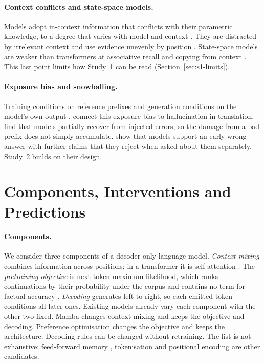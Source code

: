 \documentclass[10pt]{article}
\begin{document}
\paragraph{Context conflicts and state-space models.} Models adopt in-context information that conflicts with their parametric knowledge, to a degree that varies with model and context \citep{longpre2021,xie2024}. They are distracted by irrelevant context \citep{shi2023distracted} and use evidence unevenly by position \citep{liu2024}. State-space models are weaker than transformers at associative recall and copying from context \citep{arora2024zoology,jelassi2024repeat,waleffe2024}. This last point limits how Study~1 can be read (Section~\ref{sec:s1-limits}).

\paragraph{Exposure bias and snowballing.} Training conditions on reference prefixes and generation conditions on the model's own output \citep{ranzato2016,bengio2015}. \citet{wang2020exposure} connect this exposure bias to hallucination in translation. \citet{he2021exposure} find that models partially recover from injected errors, so the damage from a bad prefix does not simply accumulate. \citet{zhang2024snowball} show that models support an early wrong answer with further claims that they reject when asked about them separately. Study~2 builds on their design.

\section{Components, Interventions and Predictions}
\label{sec:framework}

\paragraph{Components.} We consider three components of a decoder-only language model. \emph{Context mixing} combines information across positions; in a transformer it is self-attention \citep{vaswani2017}. The \emph{pretraining objective} is next-token maximum likelihood, which ranks continuations by their probability under the corpus and contains no term for factual accuracy \citep{lin2022}. \emph{Decoding} generates left to right, so each emitted token conditions all later ones. Existing models already vary each component with the other two fixed. Mamba changes context mixing and keeps the objective and decoding. Preference optimisation changes the objective and keeps the architecture. Decoding rules can be changed without retraining. The list is not exhaustive: feed-forward memory \citep{geva2021}, tokenisation and positional encoding are other candidates.
\end{document}
